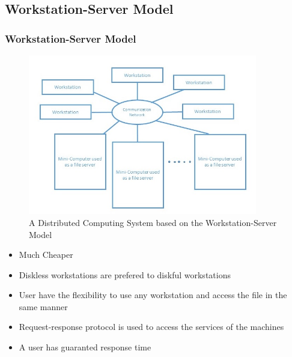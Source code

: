 \documentclass{beamer}
\begin{document}
\subsection{Workstation-Server Model}
\begin{frame}
    \frametitle{Workstation-Server Model}
    \begin{figure}
       \centering
       \includegraphics[width=10cm]{workStationServerModel}
       \caption{A Distributed Computing System based on the Workstation-Server Model}\label{workstationservermocel}
    \end{figure}
    \begin{itemize}
      \item {Much Cheaper}
      \item {Diskless workstations are prefered to diskful workstations}
      \item {User have the flexibility to use any workstation and access the file in the same manner}
      \item {Request-response protocol is used to access the services of the machines}
      \item {A user has guaranted response time}
    \end{itemize}
    \vspace{1cm}
\end{frame}
\end{document}
